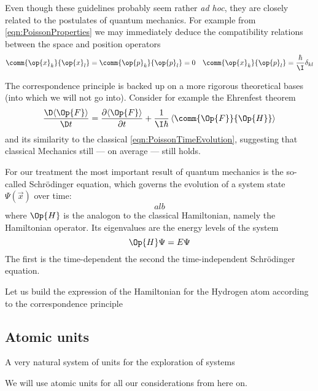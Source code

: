 Even though these guidelines probably seem rather \textit{ad hoc},
they are closely related to the postulates of quantum mechanics.
For example from \eqref{eqn:PoissonProperties}
we may immediately deduce the compatibility relations between the space
and position operators
\begin{align}
	\comm{\op{x}_k}{\op{x}_l} &= \comm{\op{p}_k}{\op{p}_l} = 0 & \comm{\op{x}_k}{\op{p}_l} = \frac{\hbar}{\I} \delta_{kl}
	\label{eqn:compatibilityOperator}
\end{align}

The correspondence principle is backed up on a more rigorous
theoretical bases (into which we will not go into).
Consider for example the Ehrenfest theorem
\[
	\frac{\D \langle \Op{F} \rangle}{\D t} = \frac{\partial \langle \Op{F} \rangle}{\partial t} + \frac{1}{\I \hbar} \left\langle \comm{\Op{F}}{\Op{H}} \right\rangle
\]
and its similarity to the classical \eqref{eqn:PoissonTimeEvolution},
suggesting that classical Mechanics still --- on average --- still holds.

For our treatment the most important result of quantum mechanics
is the so-called Schrödinger equation,
which governs the evolution of a system state $\Psi(\vec{x})$ over time:
\[
alb
\]
where $\Op{H}$ is the analogon to the classical Hamiltonian,
namely the Hamiltonian operator.
Its eigenvalues are the energy levels of the system
\[ \Op{H} \Psi = E \Psi \]
The first is the time-dependent
the second the time-independent Schrödinger equation.

Let us build the expression of the \QM Hamiltonian for the
Hydrogen atom according to the correspondence principle

\subsection{Atomic units}
A very natural system of units for the exploration of \QM systems


We will use atomic units for all our considerations from here on.


